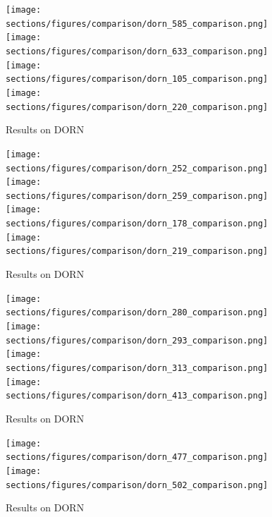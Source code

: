 \documentclass[10pt,letterpaper]{article}
\begin{document}
\begin{figure}
  \texttt{[image: sections/figures/comparison/dorn\_585\_comparison.png]}
  \texttt{[image: sections/figures/comparison/dorn\_633\_comparison.png]}
  \texttt{[image: sections/figures/comparison/dorn\_105\_comparison.png]}
  \texttt{[image: sections/figures/comparison/dorn\_220\_comparison.png]}
  \caption{Results on DORN}
\end{figure}
\begin{figure}
  \texttt{[image: sections/figures/comparison/dorn\_252\_comparison.png]}
  \texttt{[image: sections/figures/comparison/dorn\_259\_comparison.png]}
  \texttt{[image: sections/figures/comparison/dorn\_178\_comparison.png]}
  \texttt{[image: sections/figures/comparison/dorn\_219\_comparison.png]}
  \caption{Results on DORN}
\end{figure}
\begin{figure}
  \texttt{[image: sections/figures/comparison/dorn\_280\_comparison.png]}
  \texttt{[image: sections/figures/comparison/dorn\_293\_comparison.png]}
  \texttt{[image: sections/figures/comparison/dorn\_313\_comparison.png]}
  \texttt{[image: sections/figures/comparison/dorn\_413\_comparison.png]}
  \caption{Results on DORN}
\end{figure}
\begin{figure}
  \texttt{[image: sections/figures/comparison/dorn\_477\_comparison.png]}
  \texttt{[image: sections/figures/comparison/dorn\_502\_comparison.png]}
  \caption{Results on DORN}
\end{figure}
% 
% 
 
\end{document}

